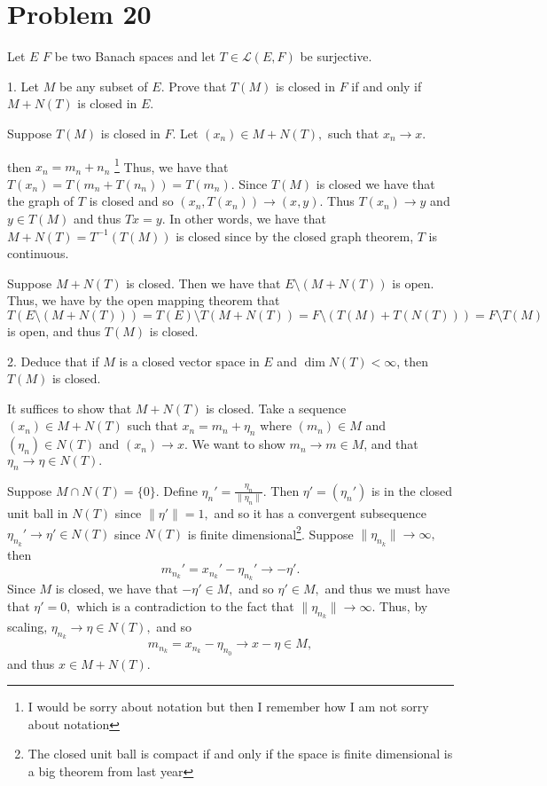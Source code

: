\documentclass[11pt]{article}
\begin{document}
\newpage
\section*{Problem 20}
\begin{problem}
{ Let } $E$  $F$ { be two Banach spaces and let } $T \in \mathcal{L}(E, F)$ { be surjective.}

1. Let \( M \) be any subset of \( E \). Prove that \( T(M) \) is closed in \( F \) if and only if \( M + N(T) \) is closed in \( E \).
\begin{solution}
    Suppose $T(M)$ is closed in $F.$ Let $(x_n)\in M+ N(T),$ such that $x_n \to x.$
    
    then $x_n = m_n + n_n$ \footnote{I would be sorry about notation but then I remember how I am not sorry about notation} Thus, we have that $T(x_n) = T(m_n + T(n_n)) = T(m_n).$ Since $T(M)$ is closed we have that the graph of $T$ is closed and so $(x_n, T(x_n)) \to (x, y).$ Thus $T(x_n) \to y$ and $y \in T(M)$ and thus $Tx = y.$ In other words, we have that $M + N(T) = T^{-1}(T(M))$ is closed since by the closed graph theorem, $T$ is continuous.

    Suppose $M+ N(T)$ is closed. Then we have that $E \setminus (M + N(T))$ is open. Thus, we have by the open mapping theorem that \[T(E \setminus (M + N(T))) = T(E)\setminus T(M + N(T)) = F \setminus (T(M) + T(N(T)))= F \setminus T(M)\] is open, and thus $T(M)$ is closed.
\end{solution}

2. Deduce that if \( M \) is a closed vector space in \( E \) and \( \dim N(T) < \infty \), then \( T(M) \) is closed.
\begin{solution}
    It suffices to show that $M + N(T)$ is closed.  Take a sequence $(x_n)\in M + N(T)$ such that $x_n = m_n + \eta_n$ where $(m_n)\in M$ and $(\eta_n)\in N(T)$ and $(x_n) \to x.$ We want to show $m_n \to m \in M$, and that $\eta_n \to \eta \in N(T).$ 
    
    
    Suppose $M \cap N(T) = \{0\}.$ Define $\eta_n' = \frac{\eta_n}{\|\eta_n\|}.$ Then $\eta' = (\eta_n')$ is in the closed unit ball in $N(T)$ since $\|\eta'\| = 1,$ and so it has a convergent subsequence $ \eta_{n_k}'\to \eta' \in N(T)$ since $N(T)$ is finite dimensional\footnote{The closed unit ball is compact if and only if the space is finite dimensional is a big theorem from last year}. 
    Suppose $\|\eta_{n_k}\|\to \infty,$ then 
    \[m_{n_k}' = x_{n_k}' - \eta_{n_k}' \to -\eta'.\] Since $M$ is closed, we have that $-\eta' \in M,$ and so $\eta' \in M,$ and thus we must have that $\eta' = 0,$ which is a contradiction to the fact that $\|\eta_{n_k}\|\to \infty.$ Thus, by scaling, $\eta_{n_k} \to \eta \in N(T),$ and so 
    \[m_{n_k} = x_{n_k} - \eta_{n_0} \to x-\eta \in M,\] and thus $x \in M + N(T).$ 


\end{solution}
\end{problem}
\end{document}
